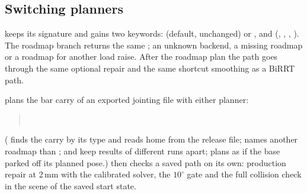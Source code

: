 \subsection{Switching planners}

 keeps its signature and gains two keywords:
 (default, unchanged) or , and
 (, , ,
). The roadmap branch returns the same ; an
unknown backend, a missing roadmap or a roadmap for another load raise. After
the roadmap plan the path goes through the same optional repair and the same
shortcut smoothing as a BiRRT path.

 plans the bar carry of an exported
jointing file with either planner:
\begin{quote}\footnotesize
{}\\
\hspace*{1.5em}
\end{quote}
( finds the carry by its type and reads home from the
release file;  names another roadmap than
;  and  keep results of
different runs apart;  plans as if the base parked off its
planned pose.)  then checks a saved path on its
own: production repair at 2\,mm with the calibrated solver, the $10^\circ$ gate
and the full collision check in the scene of the saved start state.

